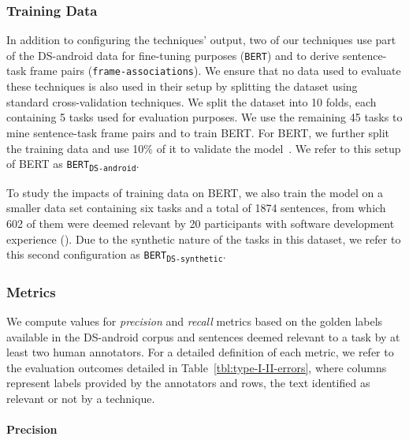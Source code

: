 \subsubsection{Training Data}


In addition to configuring the techniques' output, two of our techniques use part of the  \acs{DS-android} data for fine-tuning purposes (\texttt{BERT}) and to derive sentence-task frame pairs (\texttt{frame-associations}).
We ensure that no data used to evaluate these techniques is also used in their setup by 
splitting the dataset using standard cross-validation techniques.
We split the dataset into 10 folds, each containing 5 tasks used for evaluation purposes. 
We use the remaining 45 tasks to mine sentence-task frame pairs and to train BERT. 
For BERT, we further split the training data and use 10\% of it to validate the model~\cite{Chaparro2017, fucci2019, Petrosyan2015}.
We refer to this setup of BERT as \texttt{BERT\textsubscript{DS-android}}.


To study the impacts of training data on BERT, we also train the model on a smaller data set containing six tasks and a total of 1874 sentences, from which 602 of them were deemed relevant by 20 participants with software development experience (). Due to the synthetic nature of the tasks in this dataset, we refer to this 
second configuration as \texttt{BERT\textsubscript{DS-synthetic}}.




\subsubsection{Metrics}


We compute values for \textit{precision} and \textit{recall} metrics based on the golden labels available in the \acs{DS-android} corpus and sentences deemed relevant to a task by at least two human annotators.
For a detailed definition of each metric, we refer to the evaluation outcomes detailed in Table~\ref{tbl:type-I-II-errors}, where  columns represent  labels provided by the annotators and rows,
the text identified as relevant or not by a technique.

% 

\medskip




\paragraph{\textbf{Precision}}

